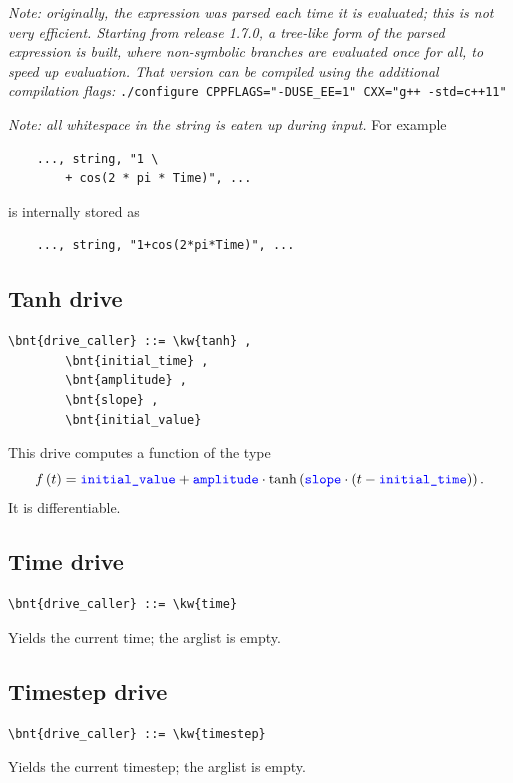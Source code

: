 \emph{Note: originally, the expression was parsed each time it is evaluated;
this is not very efficient.
Starting from release 1.7.0, a tree-like form of the
parsed expression is built, where non-symbolic branches are evaluated once for all,
to speed up evaluation. That version can be compiled using the additional compilation flags:} \verb;./configure CPPFLAGS="-DUSE_EE=1" CXX="g++ -std=c++11";

\emph{Note: all whitespace in the string is eaten up during input.}
For example
\begin{verbatim}
    ..., string, "1 \
        + cos(2 * pi * Time)", ...
\end{verbatim}
is internally stored as
\begin{verbatim}
    ..., string, "1+cos(2*pi*Time)", ...
\end{verbatim}


\subsection{Tanh drive}
\begin{Verbatim}[commandchars=\\\{\}]
    \bnt{drive_caller} ::= \kw{tanh} ,
        \bnt{initial_time} ,
        \bnt{amplitude} ,
        \bnt{slope} ,
        \bnt{initial_value}
\end{Verbatim}
This drive computes a function of the type
\begin{displaymath}
	f\left( t \right) = \textcolor{blue}{\texttt{initial\_value}} + \textcolor{blue}{\texttt{amplitude}} \cdot\mathrm{tanh}\left( 
			\textcolor{blue}{\texttt{slope}} \cdot \left( 
				t - \textcolor{blue}{\texttt{initial\_time}}
			 \right)
		 \right) .
\end{displaymath}
It is differentiable.


\subsection{Time drive}
\begin{Verbatim}[commandchars=\\\{\}]
    \bnt{drive_caller} ::= \kw{time}
\end{Verbatim}
Yields the current time; the arglist is empty.

\subsection{Timestep drive}
\begin{Verbatim}[commandchars=\\\{\}]
    \bnt{drive_caller} ::= \kw{timestep}
\end{Verbatim}
Yields the current timestep; the arglist is empty.

